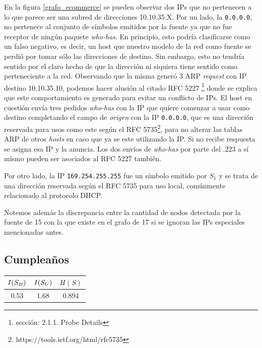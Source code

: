 En la figura \ref{grafo_ecommerce} se pueden observar dos IPs que no pertenecen a lo que parece ser una subred de direcciones 10.10.35.X. Por un lado, la \texttt{0.0.0.0}, no pertenece al conjunto de símbolos emitidos por la fuente ya que no fue receptor de ningún paquete \textit{who-has}. En principio, esto podría clasificarse como un falso negativo, es decir, un host que nuestro modelo de la red como fuente se perdió por tomar sólo las direcciones de destino. Sin embargo, esto no tendría sentido por el claro hecho de que la dirección ni siquiera tiene sentido como perteneciente a la red. Observando que la misma generó 3 ARP \textit{request} con IP destino 10.10.35.10, podemos hacer alusión al citado RFC 5227 \footnote{sección: 2.1.1. Probe Details} donde se explica que este comportamiento es generado para evitar un conflicto de IPs. El host en cuestión envía tres pedidos \textit{who-has} con la IP que quiere comenzar a usar como destino completando el campo de \textit{origen} con la IP \texttt{0.0.0.0}, que es una dirección reservada para usos como este según el RFC 5735\footnote{https://tools.ietf.org/html/rfc5735}, para no alterar las tablas ARP de otros \textit{hosts} en caso que ya se este utilizando la IP. Si no recibe respuesta se asigna esa IP y la anuncia. Los dos envíos de \textit{who-has} por parte del .223 a sí mismo pueden ser asociados al RFC 5227 también.

Por otro lado, la IP \texttt{169.254.255.255} fue un símbolo emitido por $S_1$ y se trata de una dirección reservada según el RFC 5735 para uso local, comúnmente relacionado al protocolo DHCP.

Notemos además la discrepancia entre la cantidad de nodos detectada por la fuente de 15 con la que existe en el grafo de 17 si se ignoran las IPs especiales mencionadas antes.


\subsection{\textbf{Cumpleaños}}

\begin{center}\small
	\begin{tabular}{ c | c | c }
	  $I(S_{B})$ & $I(S_{U})$ & $H(S)$ \\
	  \hline
	  0.53 & 1.68 & 0.894 \\
	\end{tabular}
\end{center}

